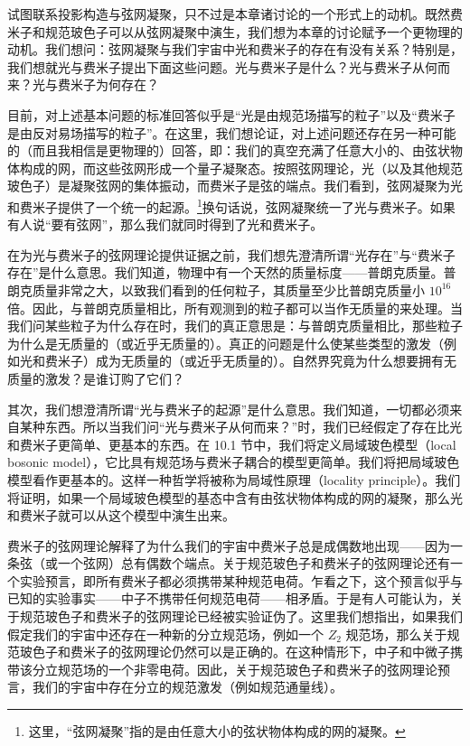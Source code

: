 试图联系投影构造与弦网凝聚，只不过是本章诸讨论的一个形式上的动机。既然费米子和规范玻色子可以从弦网凝聚中演生，我们想为本章的讨论赋予一个更物理的动机。我们想问：弦网凝聚与我们宇宙中光和费米子的存在有没有关系？特别是，我们想就光与费米子提出下面这些问题。光与费米子是什么？光与费米子从何而来？光与费米子为何存在？

目前，对上述基本问题的标准回答似乎是“光是由规范场描写的粒子”以及“费米子是由反对易场描写的粒子”。在这里，我们想论证，对上述问题还存在另一种可能的（而且我相信是更物理的）回答，即：我们的真空充满了任意大小的、由弦状物体构成的网，而这些弦网形成一个量子凝聚态。按照弦网理论，光（以及其他规范玻色子）是凝聚弦网的集体振动，而费米子是弦的端点。我们看到，弦网凝聚为光和费米子提供了一个统一的起源。\footnote{这里，“弦网凝聚”指的是由任意大小的弦状物体构成的网的凝聚。}换句话说，弦网凝聚统一了光与费米子。如果有人说“要有弦网”，那么我们就同时得到了光和费米子。

在为光与费米子的弦网理论提供证据之前，我们想先澄清所谓“光存在”与“费米子存在”是什么意思。我们知道，物理中有一个天然的质量标度——普朗克质量。普朗克质量非常之大，以致我们看到的任何粒子，其质量至少比普朗克质量小 $10^{16}$ 倍。因此，与普朗克质量相比，所有观测到的粒子都可以当作无质量的来处理。当我们问某些粒子为什么存在时，我们的真正意思是：与普朗克质量相比，那些粒子为什么是无质量的（或近乎无质量的）。真正的问题是什么使某些类型的激发（例如光和费米子）成为无质量的（或近乎无质量的）。自然界究竟为什么想要拥有无质量的激发？是谁订购了它们？

其次，我们想澄清所谓“光与费米子的起源”是什么意思。我们知道，一切都必须来自某种东西。所以当我们问“光与费米子从何而来？”时，我们已经假定了存在比光和费米子更简单、更基本的东西。在 10.1 节中，我们将定义局域玻色模型（local bosonic model），它比具有规范场与费米子耦合的模型更简单。我们将把局域玻色模型看作更基本的。这样一种哲学将被称为局域性原理（locality principle）。我们将证明，如果一个局域玻色模型的基态中含有由弦状物体构成的网的凝聚，那么光和费米子就可以从这个模型中演生出来。

费米子的弦网理论解释了为什么我们的宇宙中费米子总是成偶数地出现——因为一条弦（或一个弦网）总有偶数个端点。关于规范玻色子和费米子的弦网理论还有一个实验预言，即所有费米子都必须携带某种规范电荷。乍看之下，这个预言似乎与已知的实验事实——中子不携带任何规范电荷——相矛盾。于是有人可能认为，关于规范玻色子和费米子的弦网理论已经被实验证伪了。这里我们想指出，如果我们假定我们的宇宙中还存在一种新的分立规范场，例如一个 $Z_2$ 规范场，那么关于规范玻色子和费米子的弦网理论仍然可以是正确的。在这种情形下，中子和中微子携带该分立规范场的一个非零电荷。因此，关于规范玻色子和费米子的弦网理论预言，我们的宇宙中存在分立的规范激发（例如规范通量线）。

